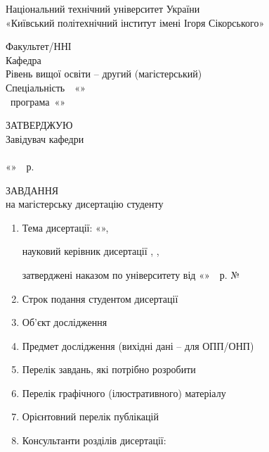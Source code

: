 \thispagestyle{empty}

\begin{center}
  Національний технічний університет України\\
  «Київський політехнічний інститут імені Ігоря Сікорського»
\end{center}

\vspace{1em}
\noindent Факультет/ННІ~\facultyName\\
Кафедра~\departmentName\\
Рівень вищої освіти -- другий (магістерський)\\
Спеціальність~\specialtyCode~«\specialtyName»\\
\programmeType~програма~«\programmeName»

\vspace{2em}
\begin{flushright}
  \begin{minipage}{7.5cm}
    ЗАТВЕРДЖУЮ\\
    Завідувач кафедри\\
    \hrulefill\ \departmentHeadName\\
    «\hrulefill»\hrulefill~\thesisYear~р.
  \end{minipage}
\end{flushright}

\begin{center}
  ЗАВДАННЯ\\
  на магістерську дисертацію студенту\\
  \authorFullName
\end{center}

\begin{enumerate}[leftmargin=*]
  \item Тема дисертації: «\thesisTitle»,

  науковий керівник дисертації \supervisorFullName, \supervisorRegalia,

  затверджені наказом по університету від «\hrulefill»\hrulefill~\thesisYear~р. №~\hrulefill
  \item Строк подання студентом дисертації \hrulefill
  \item Об'єкт дослідження \hrulefill
  \item Предмет дослідження (вихідні дані -- для ОПП/ОНП) \hrulefill
  \item Перелік завдань, які потрібно розробити \hrulefill
  \item Перелік графічного (ілюстративного) матеріалу \hrulefill
  \item Орієнтовний перелік публікацій \hrulefill
  \item Консультанти розділів дисертації:
\end{enumerate}

